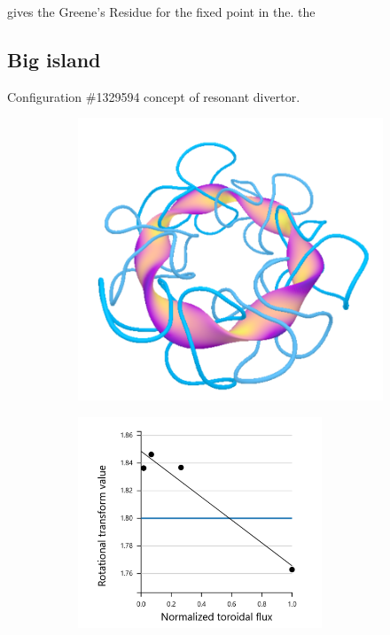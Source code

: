  gives the Greene's Residue for the fixed point in the. the

\subsection{Big island}\label{sec:quars-1329594}

Configuration \#1329594 concept of resonant divertor.

\begin{figure}[H]
    \centering
    \begin{subfigure}[t]{0.49\textwidth}
        \centering
        \includegraphics[width=\textwidth]{images/quasrs/config-1329594.png}
        \caption{}
        \label{fig:coils-1329594}
    \end{subfigure}
    \hfill
    \begin{subfigure}[t]{0.49\textwidth}
        \centering
        \includegraphics[width=0.8\textwidth]{images/quasrs/iota-1329594.png}

\end{subfigure}
\end{figure}
